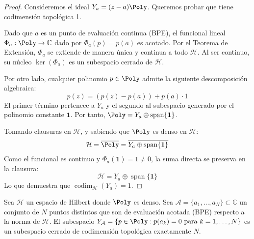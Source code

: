 \begin{proof}
	Consideremos el ideal $Y_a = (z-a)\Poly$. Queremos probar que tiene codimensión topológica 1.

	Dado que $a$ es un punto de evaluación continua (BPE), el funcional lineal $\Phi_a: \Poly \to \mathbb{C}$ dado por $\Phi_a(p) = p(a)$ es acotado. Por el Teorema de Extensión, $\Phi_a$ se extiende de manera única y continua a todo $\mathcal{H}$. Al ser continuo, su núcleo $\ker(\Phi_a)$ es un subespacio cerrado de $\mathcal{H}$.

	Por otro lado, cualquier polinomio $p \in \Poly$ admite la siguiente descomposición algebraica:
	$$p(z) = (p(z) - p(a)) + p(a) \cdot 1$$
	El primer término pertenece a $Y_a$ y el segundo al subespacio generado por el polinomio constante $\mathbf{1}$. Por tanto, $\Poly = Y_a \oplus \operatorname{span}\{\mathbf{1}\}$.

	Tomando clausuras en $\mathcal{H}$, y sabiendo que $\Poly$ es denso en $\mathcal{H}$:
	$$\mathcal{H} = \overline{\Poly} = \overline{Y_a \oplus \operatorname{span}\{\mathbf{1}\}}$$
	Como el funcional es continuo y $\Phi_a(\mathbf{1}) = 1 \neq 0$, la suma directa se preserva en la clausura:
	$$\mathcal{H} = Y_a \oplus \operatorname{span}\{\mathbf{1}\}$$
	Lo que demuestra que $\operatorname{codim}_{\mathcal{H}}(Y_a) = 1$.
\end{proof}

\begin{prop}
	Sea $\mathcal{H}$ un espacio de Hilbert donde $\Poly$ es denso. Sea $\mathcal{A} = \{a_1, \dots, a_N\} \subset \mathbb{C}$ un conjunto de $N$ puntos distintos que son de evaluación acotada (BPE) respecto a la norma de $\mathcal{H}$. El subespacio $Y_{\mathcal{A}} = \{p \in \Poly : p(a_k) = 0 \text{ para } k=1,\dots,N\}$ es un subespacio cerrado de codimensión topológica exactamente $N$.
\end{prop}

